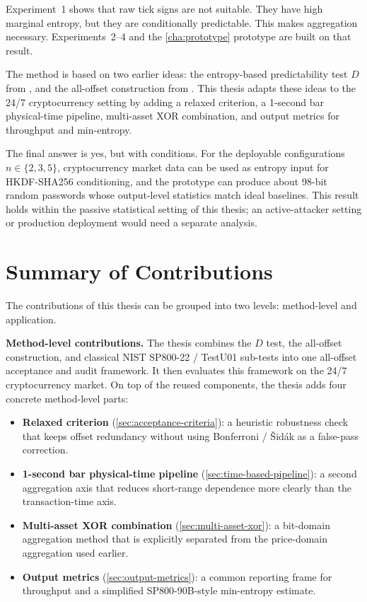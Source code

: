 \documentclass[11pt,titlepage,openany,oneside]{book}  %
\begin{document}
Experiment~1 shows that raw tick signs are not suitable. They have high marginal entropy, but they are conditionally predictable. This makes aggregation necessary. Experiments~2--4 and the \cref{cha:prototype} prototype are built on that result.

The method is based on two earlier ideas: the entropy-based predictability test $D$ from \citet{shternshis2025predictability}, and the all-offset construction from \citet{onofri2025emergence}. This thesis adapts these ideas to the 24/7 cryptocurrency setting by adding a relaxed criterion, a 1-second bar physical-time pipeline, multi-asset XOR combination, and output metrics for throughput and min-entropy.

The final answer is yes, but with conditions. For the deployable configurations $n \in \{2,3,5\}$, cryptocurrency market data can be used as entropy input for HKDF-SHA256 conditioning, and the prototype can produce about 98-bit random passwords whose output-level statistics match ideal baselines. This result holds within the passive statistical setting of this thesis; an active-attacker setting or production deployment would need a separate analysis.

\section{Summary of Contributions}
\label{sec:summary-contributions}

The contributions of this thesis can be grouped into two levels: method-level and application.

\textbf{Method-level contributions.} The thesis combines the $D$ test, the all-offset construction, and classical NIST SP800-22 / TestU01 sub-tests into one all-offset acceptance and audit framework. It then evaluates this framework on the 24/7 cryptocurrency market. On top of the reused components, the thesis adds four concrete method-level parts:

\begin{itemize}
\item \textbf{Relaxed criterion} (\cref{sec:acceptance-criteria}): a heuristic robustness check that keeps offset redundancy without using Bonferroni / \v{S}id\'ak as a false-pass correction.
\item \textbf{1-second bar physical-time pipeline} (\cref{sec:time-based-pipeline}): a second aggregation axis that reduces short-range dependence more clearly than the transaction-time axis.
\item \textbf{Multi-asset XOR combination} (\cref{sec:multi-asset-xor}): a bit-domain aggregation method that is explicitly separated from the price-domain aggregation used earlier.
\item \textbf{Output metrics} (\cref{sec:output-metrics}): a common reporting frame for throughput and a simplified SP800-90B-style min-entropy estimate.
\end{itemize}
\end{document}
